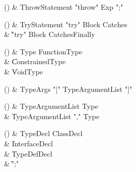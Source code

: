 \begin{bbgrammarappendix}

() & ThrowStatement \label{prod:ThrowStatement}  \: \xcd"throw" Exp \xcd";"  \\


\end{bbgrammarappendix}

\begin{bbgrammarappendix}

() & TryStatement \label{prod:TryStatement}  \: \xcd"try" Block Catches  \\

 &    \| \xcd"try" Block Catches\opt Finally \\

\end{bbgrammarappendix}

\begin{bbgrammarappendix}

() & Type \label{prod:Type}  \: FunctionType  \\

 &    \| ConstrainedType \\
 &    \| VoidType \\

\end{bbgrammarappendix}

\begin{bbgrammarappendix}

() & TypeArgs \label{prod:TypeArgs}  \: \xcd"[" TypeArgumentList \xcd"]"  \\


\end{bbgrammarappendix}

\begin{bbgrammarappendix}

() & TypeArgumentList \label{prod:TypeArgumentList}  \: Type  \\

 &    \| TypeArgumentList \xcd"," Type \\

\end{bbgrammarappendix}

\begin{bbgrammarappendix}

() & TypeDecl \label{prod:TypeDecl}  \: ClassDecl  \\

 &    \| InterfaceDecl \\
 &    \| TypeDefDecl \\
 &    \| \xcd";" \\

\end{bbgrammarappendix}

